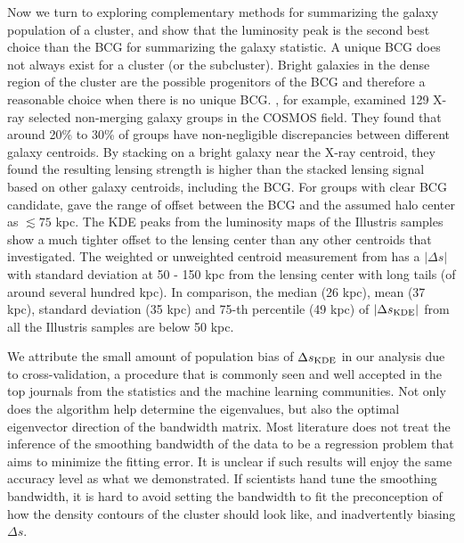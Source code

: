Now we turn to exploring complementary methods for summarizing
the galaxy population of a cluster, and show that  the luminosity peak 
is the second best choice than the BCG for summarizing the galaxy statistic.
A unique BCG does not always exist for a cluster (or the subcluster).   
Bright galaxies in the dense region of the cluster are the possible progenitors 
of the BCG and therefore a reasonable choice when there is no unique BCG. 
\cite{George2012a}, for example, examined 129 X-ray selected non-merging galaxy 
groups in the COSMOS field.
They found that around 20\% to 30\% of groups have non-negligible discrepancies
between different galaxy centroids. 
By stacking on a bright galaxy near the X-ray centroid, they found  
the resulting lensing strength is higher than the stacked lensing signal based
on other galaxy centroids, including the BCG. 
For groups with clear BCG candidate, \cite{George2012a} gave the range of
offset between the BCG and the assumed halo center as $\lesssim 75$ kpc. 
The KDE peaks from the luminosity maps of the Illustris samples show a much 
tighter offset to the 
lensing center than any other centroids that \cite{George2012a} investigated. 
The weighted or unweighted centroid measurement from \cite{George2012a} has a 
$|\Delta s|$ with standard deviation at 50 - 150 kpc from the
lensing center with long tails (of around several hundred kpc). 
In comparison, the median (26 kpc), mean (37 kpc), standard deviation (35 kpc) 
and 75-th percentile (49 kpc) of 
$|\Delta s_{\rm KDE}|$ from all the Illustris samples are below 50 kpc. 

We attribute the small amount of population bias of $\Delta s_{\rm KDE}$ in our
analysis due 
to cross-validation, a procedure that is commonly seen and well accepted 
in the top journals 
from the statistics and the machine learning communities. 
Not only does the algorithm help
determine the eigenvalues, but also the optimal eigenvector direction of 
the bandwidth matrix. 
Most literature does not treat the inference of the smoothing bandwidth 
of the data to be a regression problem that aims to minimize the fitting error.  
It is unclear if such results will enjoy the same accuracy level as what
we demonstrated. 
If scientists hand tune the smoothing bandwidth, it is hard to
avoid setting the bandwidth to fit the preconception of how the density
contours of the cluster 
should look like, and inadvertently biasing $\Delta s$.

